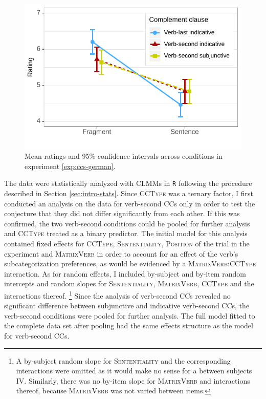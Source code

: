 \begin{figure}[t]
\includegraphics[scale=1]{figures/ex2b_ccs_de_lc_estimates}
 \caption{Mean ratings and 95\% confidence intervals across conditions in experiment \ref{exp:ccs-german}. \label{fig:ccs-german-estimates}}
\end{figure}
%
\noindent The data were statistically analyzed with CLMMs in \texttt{R} following the procedure described in Section \ref{sec:intro-stats}. Since \textsc{CCType} was a ternary factor, I first conducted an analysis on the data for verb-second CCs only in order to test the conjecture that they did not differ significantly from each other. If this was confirmed, the two verb-second conditions could be pooled for further analysis and \textsc{CCType} treated as a binary predictor. The initial model for this analysis contained fixed effects for \textsc{CCType}, \textsc{Sententiality}, \textsc{Position} of the trial in the experiment and \textsc{MatrixVerb} in order to account for an effect of the verb's subcategorization preferences, as would be evidenced by a \textsc{MatrixVerb:CCType} interaction. As for random effects, I included by-subject and by-item random intercepts and random slopes for \textsc{Sententiality}, \textsc{MatrixVerb}, \textsc{CCType} and the interactions thereof.%
% 
\footnote{A by-subject random slope for \textsc{Sententiality} and the corresponding interactions were omitted as it would make no sense for a between subjects IV. Similarly, there was no by-item slope for \textsc{MatrixVerb} and interactions thereof, because \textsc{MatrixVerb} was not varied between items.}\afterfn%
%
Since the analysis of verb-second CCs revealed no significant difference between subjunctive and indicative  verb-second CCs, the verb-second conditions were pooled for further analysis. The full model fitted to the complete data set after pooling had the same effects structure as the model for verb-second CCs.
\newpage

